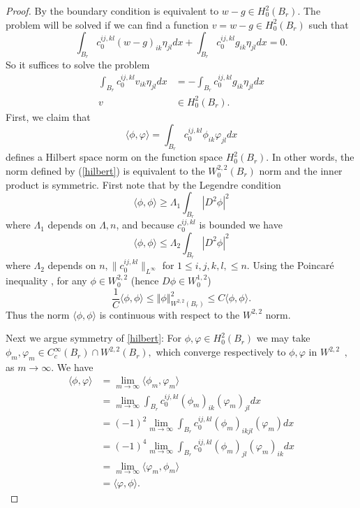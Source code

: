 \documentclass[12pt,leqno]{amsart}%
\theoremstyle{plain}
\numberwithin{equation}{section}
\theoremstyle{definition}
\begin{document}
\begin{proof}
By \cite[Corollary 6.48, 6.49]{Folland} the boundary condition is equivalent to $w-g \in  H_{0}^{2}(B_{r}) $. The problem will be solved if we can find a function $v = w-g \in H_{0}^{2}(B_{r})$ such that 
\[
\int_{B_{r}}c_{0}^{ij,kl}\left(  w-g\right)  _{ik}\eta_{jl}dx+\int_{B_{r}%
}c_{0}^{ij,kl}g_{ik}\eta_{jl}dx=0.
\]
So it suffices to solve the problem 
\begin{align*}
\int_{B_{r}}c_{0}^{ij,kl}v_{ik}\eta_{jl}dx  &  =-\int_{B_{r}}c_{0}%
^{ij,kl}g_{ik}\eta_{jl}dx\\
 v &\in  H_{0}^{2}(B_{r}). 
\end{align*}
First, we claim that
\begin{equation}
\langle\phi,\varphi\rangle=\int_{B_r} c_{0}^{ij,kl}\phi_{ik}\varphi_{jl}dx
\label{hilbert}%
\end{equation}
defines a Hilbert space norm on the function space $H_{0}^{2}(B_{r}).$ In
other words, the norm defined by (\ref{hilbert}) is equivalent to the
$W^{2,2}_0(B_{r})$ norm
and the inner product is symmetric. First note that by the Legendre condition
\[
\langle\phi,\phi\rangle\geq\Lambda_{1}\int_{B_r}\left\vert D^{2}\phi\right\vert ^{2}
\]
where $\Lambda_1$ depends on $\Lambda, n$, and because $c^{ij,kl}_{0}$ is bounded we have
\[
\langle\phi,\phi\rangle\leq\Lambda_{2}\int_{B_r}\left\vert D^{2}\phi\right\vert^{2}
\]
where $\Lambda_2$ depends on $n,\|c_0^{ij,kl}\|_{L^\infty}$ for $1\leq i,j,k,l,\leq n$. 
Using the Poincar\'e inequality \cite[(7.44)]{GT},
for any $\phi\in W_{0}^{2,2}$ (hence $D\phi\in W^{1,2}_{0}$)
\[
\frac{1}{C}\langle\phi,\phi\rangle\leq\left\Vert \phi\right\Vert
_{W^{2,2}(B_{r})}^{2}\leq C\langle\phi,\phi\rangle.
\]
Thus the norm $\langle\phi,\phi\rangle$ is continuous with respect to the
$W^{2,2}$ norm.

Next we argue symmetry of \eqref{hilbert}: For $\phi,\varphi\in H_{0}%
^{2}(B_{r})$ we may take $\phi_{m},\varphi_{m}\in C_{c}^{\infty}(B_{r})\cap
W^{2,2}(B_{r}),$ which converge respectively to $\phi,\varphi$ in
$W^{2,2\text{ }},$ as $m\rightarrow\infty.$ We have
\begin{align*}
\langle\phi,\varphi\rangle &  =\lim_{m\rightarrow\infty}\langle\phi
_{m},\varphi_{m}\rangle\\
&  =\lim_{m\rightarrow\infty}\int_{B_r} c_{0}^{ij,kl}\left(  \phi_{m}\right)
_{ik}\left(  \varphi_{m}\right)  _{jl}dx\\
&  =(-1)^{2}\lim_{m\rightarrow\infty}\int_{B_r} c_{0}^{ij,kl}\left(  \phi
_{m}\right)  _{ikjl}\left(  \varphi_{m}\right)  dx\\
&  =(-1)^{4}\lim_{m\rightarrow\infty}\int_{B_r} c_{0}^{ij,kl}\left(  \phi
_{m}\right)  _{jl}\left(  \varphi_{m}\right)  _{ik}dx\\
&  =\lim_{m\rightarrow\infty}\langle\varphi_{m},\phi_{m}\rangle\\
&  =\langle\varphi,\phi\rangle.
\end{align*}



\end{proof}
\end{document}
